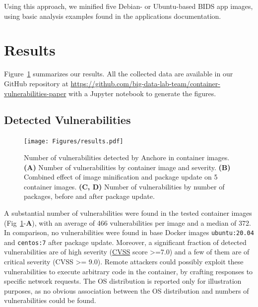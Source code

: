 \documentclass[a4paper,num-refs]{oup-contemporary}
\begin{document}
Using this approach, we minified five Debian- or Ubuntu-based BIDS app images,
using basic analysis examples found in the applications documentation.



\section{Results}

Figure~\ref{fig:vulnerabilities} summarizes our results. All the collected
data are available in our GitHub repository at
\url{https://github.com/big-data-lab-team/container-vulnerabilities-paper}
with a Jupyter notebook to generate the figures. 

\subsection{Detected Vulnerabilities}


\begin{figure}
\texttt{[image: Figures/results.pdf]}
\caption{\label{fig:vulnerabilities} Number of vulnerabilities detected
by Anchore in container images. \textbf{(A)} Number of vulnerabilities
by container image and severity. \textbf{(B)} Combined
effect of image minification and package update on 5 container images. \textbf{(C, D)}
Number of vulnerabilities by number of packages, before and after
package update.}
\end{figure}

A substantial number of vulnerabilities were found in the tested container
 images (Fig~\ref{fig:vulnerabilities}-\textbf{A}), with an average of 466 vulnerabilities
  per image and a median of 372. In comparison, no vulnerabilities were found in base
 Docker images \texttt{ubuntu:20.04} and \texttt{centos:7} after package
 update. Moreover, a significant fraction of detected vulnerabilities are
 of high severity
 (\href{https://www.first.org/cvss/specification-document}{CVSS} score
 >=7.0) and a few of them are of critical severity (CVSS >= 9.0). Remote
 attackers could possibly exploit these vulnerabilities to execute
 arbitrary code in the container, by crafting responses to specific network
 requests. The OS distribution is reported only for illustration purposes,
 as no obvious association between the OS distribution and numbers of
 vulnerabilities could be found.
\end{document}
